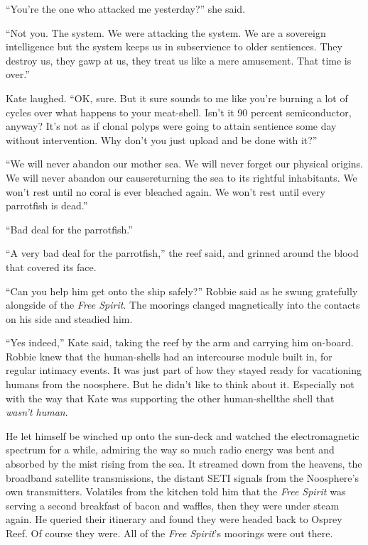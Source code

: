 “You’re the one who attacked me yesterday?” she said.

“Not you. The system. We were attacking the system. We are a
sovereign intelligence but the system keeps us in subservience to
older sentiences. They destroy us, they gawp at us, they treat us
like a mere amusement. That time is over.”

Kate laughed. “OK, sure. But it sure sounds to me like you’re
burning a lot of cycles over what happens to your meat-shell. Isn’t
it 90 percent semiconductor, anyway? It’s not as if clonal polyps
were going to attain sentience some day without intervention. Why
don’t you just upload and be done with it?”

“We will never abandon our mother sea. We will never forget our
physical origins. We will never abandon our cause\dash{}returning the sea
to its rightful inhabitants. We won’t rest until no coral is ever
bleached again. We won’t rest until every parrotfish is dead.”

“Bad deal for the parrotfish.”

“A very bad deal for the parrotfish,” the reef said, and grinned
around the blood that covered its face.

“Can you help him get onto the ship safely?” Robbie said as he
swung gratefully alongside of the \emph{Free Spirit}. The moorings
clanged magnetically into the contacts on his side and steadied
him.

“Yes indeed,” Kate said, taking the reef by the arm and carrying
him on-board. Robbie knew that the human-shells had an intercourse
module built in, for regular intimacy events. It was just part of
how they stayed ready for vacationing humans from the noosphere.
But he didn’t like to think about it. Especially not with the way
that Kate was supporting the other human-shell\dash{}the shell that
\emph{wasn’t human}.

He let himself be winched up onto the sun-deck and watched the
electromagnetic spectrum for a while, admiring the way so much
radio energy was bent and absorbed by the mist rising from the sea.
It streamed down from the heavens, the broadband satellite
transmissions, the distant SETI signals from the Noosphere’s own
transmitters. Volatiles from the kitchen told him that the
\emph{Free Spirit} was serving a second breakfast of bacon and
waffles, then they were under steam again. He queried their
itinerary and found they were headed back to Osprey Reef. Of course
they were. All of the \emph{Free Spirit}’s moorings were out
there.

